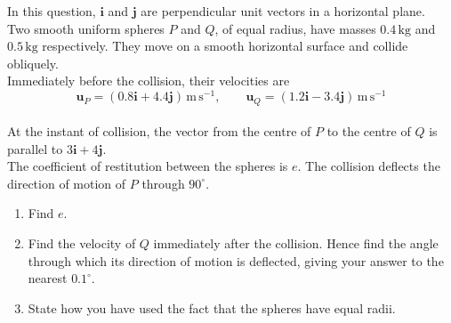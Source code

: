 \documentclass[leqno]{article}
\begin{document}
\begin{enumerate}[
  label=\textbf{\arabic*.},
  leftmargin=*,
  topsep=0pt,
  partopsep=0pt,
  parsep=0pt
]
\begin{djsSolution}
\begin{enumerate}[label=\textbf{(\alph*)}, start=1]
\end{enumerate}
\end{djsSolution}

\newpage

\questionitem

In this question, $\mathbf{i}$ and $\mathbf{j}$ are perpendicular unit vectors in a horizontal plane. \\

Two smooth uniform spheres $P$ and $Q$, of equal radius, have masses $0.4\,\mathrm{kg}$ and $0.5\,\mathrm{kg}$ respectively. They move on a smooth horizontal surface and collide obliquely. \\

Immediately before the collision, their velocities are
\[
\mathbf{u}_P=(0.8\mathbf{i}+4.4\mathbf{j})\,\mathrm{m\,s^{-1}},\qquad \mathbf{u}_Q=(1.2\mathbf{i}-3.4\mathbf{j})\,\mathrm{m\,s^{-1}}
\] \\
At the instant of collision, the vector from the centre of $P$ to the centre of $Q$ is parallel to $3\mathbf{i}+4\mathbf{j}$. \\

The coefficient of restitution between the spheres is $e$. The collision deflects the direction of motion of $P$ through $90^\circ$. \\
\begin{enumerate}[label=\textbf{(\alph*)}]
\item Find $e$.  \\
\item Find the velocity of $Q$ immediately after the collision. Hence find the angle through which its direction of motion is deflected, giving your answer to the nearest $0.1^\circ$.  \\
\item State how you have used the fact that the spheres have equal radii.  \\
\end{enumerate}

\vspace*{10pt}


\end{enumerate}
\end{document}
